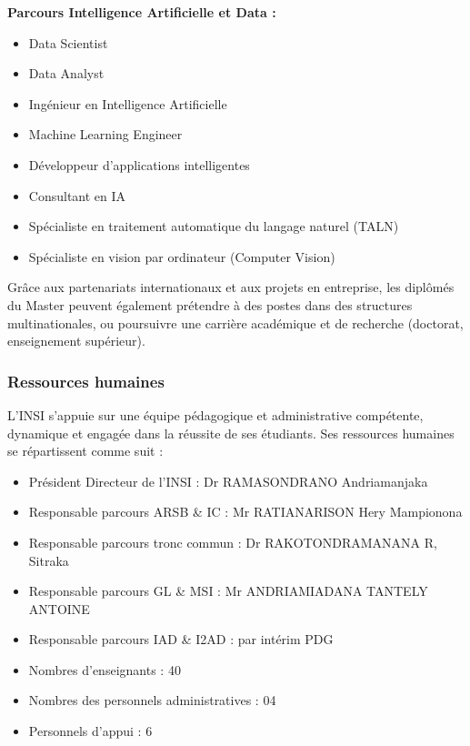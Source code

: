 \documentclass[a4paper,12pt, oneside]{article}
\begin{document}
\textbf{Parcours Intelligence Artificielle et Data :}
\begin{itemize}
    \item Data Scientist
    \item Data Analyst
    \item Ingénieur en Intelligence Artificielle
    \item Machine Learning Engineer
    \item Développeur d'applications intelligentes
    \item Consultant en IA
    \item Spécialiste en traitement automatique du langage naturel (TALN)
    \item Spécialiste en vision par ordinateur (Computer Vision)
\end{itemize}

Grâce aux partenariats internationaux et aux projets en entreprise, les diplômés du Master peuvent également prétendre à des postes dans des structures multinationales, ou poursuivre une carrière académique et de recherche (doctorat, enseignement supérieur).\\

\subsubsection{Ressources humaines} 
L’INSI s’appuie sur une équipe pédagogique et administrative compétente, dynamique et engagée dans la réussite de ses étudiants. Ses ressources humaines se répartissent comme suit :
\begin{itemize}
    \item Président Directeur de l’INSI : Dr RAMASONDRANO Andriamanjaka
    \item Responsable parcours ARSB \& IC : Mr RATIANARISON Hery Mampionona
    \item Responsable parcours tronc commun : Dr RAKOTONDRAMANANA R, Sitraka
    \item Responsable parcours GL \& MSI : Mr ANDRIAMIADANA TANTELY ANTOINE
    \item Responsable parcours IAD \& I2AD : par intérim PDG
    \item Nombres d'enseignants : 40
    \item Nombres des personnels administratives : 04
    \item Personnels d’appui : 6
\end{itemize}

\vfill*{}
\newpage
\end{document}
